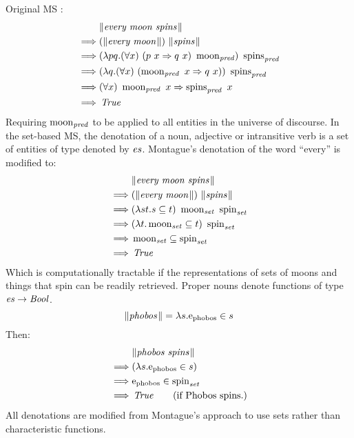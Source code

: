\documentclass[../main.tex]{subfiles}
\begin{document}
\begin{refsection}
Original MS \cite{Dowty:wall}:
\begin{equation*}
	\begin{split}
		& \lVert\textit{every moon spins\hspace{0.1em}}\rVert \\
		\implies&  (\lVert\textit{every moon\hspace{0.1em}}\rVert) \ \lVert\textit{spins\hspace{0.1em}}\rVert \\
		\implies&  (\lambda pq.(\forall x)\ (p \  x \Rightarrow q \  x) \  \operatorname{moon}_{\operatorname{\mathit{pred}}}) \  \operatorname{spins}_{\operatorname{\mathit{pred}}} \\
		\implies&  (\lambda q.(\forall x)\ (\operatorname{moon}_{\operatorname{\mathit{pred}}} \ x \Rightarrow q \ x)) \  \operatorname{spins}_{\operatorname{\mathit{pred}}} \\
		\implies&  (\forall x)\ \operatorname{moon}_{\operatorname{\mathit{pred}}} \ x \Rightarrow \operatorname{spins}_{\operatorname{\mathit{pred}}} \ x \\
		\implies&  \operatorname{\mathit{True}}
	\end{split}
\end{equation*}
Requiring $\operatorname{moon}_{\operatorname{\mathit{pred}}}$ to be applied to all entities in the universe of discourse. In the set-based MS, the denotation of a noun, adjective or intransitive verb is a set of entities of type denoted by $\operatorname{\mathit{es}}$.
Montague's denotation of the word ``every'' is modified to:
\begin{equation*}
	\begin{split}
		& \meaningof{every moon spins} \\
		\implies&  (\meaningof{every moon}) \  \meaningof{spins} \\
		\implies&  (\lambda st.s \subseteq t)\ \wordset{moon} \ \wordset{spin} \\
		\implies&  (\lambda t.\wordset{moon} \subseteq t)\ \wordset{spin} \\
		\implies&  \wordset{moon} \subseteq \wordset{spin} \\
		\implies&  \True
	\end{split}
\end{equation*}
Which is computationally tractable if the representations of sets of moons and things that spin can be readily retrieved.
Proper nouns denote functions of type $\operatorname{\mathit{es}} \rightarrow \operatorname{\mathit{Bool}}$.
\[
\lVert\textit{phobos\hspace{0.1em}}\rVert = \lambda s.\mathrm{e}_{\operatorname{phobos}} \in s
\]
Then:
\begin{equation*}
	\begin{split}
		& \lVert\textit{phobos spins\hspace{0.1em}}\rVert \\
		\implies& (\lambda s.\mathrm{e}_{\operatorname{phobos}} \in s) \\
		\implies& \mathrm{e}_{\operatorname{phobos}} \in \operatorname{spin}_{\operatorname{\mathit{set}}} \\
		\implies& \operatorname{\mathit{True}} \qquad(\text{if Phobos spins.})
	\end{split}
\end{equation*}
All denotations are modified from Montague's approach to use sets rather than characteristic functions.


\end{refsection}
\end{document}
